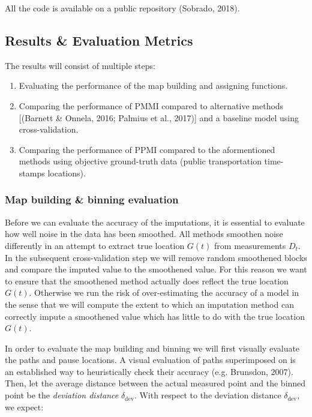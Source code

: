 \documentclass[man]{apa6}
\providecommand{\tightlist}{%
  \setlength{\itemsep}{0pt}\setlength{\parskip}{0pt}}
\theoremstyle{definition}
\theoremstyle{definition}
\theoremstyle{definition}
\theoremstyle{remark}
\begin{document}
All the code is available on a public repository (Sobrado, 2018).

\subsection{Results \& Evaluation
Metrics}\label{results-evaluation-metrics}

The results will consist of multiple steps:

\begin{enumerate}
\def\labelenumi{\arabic{enumi}.}
\tightlist
\item
  Evaluating the performance of the map building and assigning
  functions.
\item
  Comparing the performance of PMMI compared to alternative methods
  {[}(Barnett \& Onnela, 2016; Palmius et al., 2017){]} and a baseline
  model using cross-validation.
\item
  Comparing the performance of PPMI compared to the aformentioned
  methods using objective ground-truth data (public transportation
  time-stamps locations).
\end{enumerate}

\subsubsection{Map building \& binning
evaluation}\label{map-building-binning-evaluation}

Before we can evaluate the accuracy of the imputations, it is essential
to evaluate how well noise in the data has been smoothed. All methods
smoothen noise differently in an attempt to extract true location
\(G(t)\) from measurements \(D_t\). In the subsequent cross-validation
step we will remove random smoothened blocks and compare the imputed
value to the smoothened value. For this reason we want to ensure that
the smoothened method actually does reflect the true location \(G(t)\).
Otherwise we run the risk of over-estimating the accuracy of a model in
the sense that we will compute the extent to which an imputation method
can correctly impute a smoothened value which has little to do with the
true location \(G(t)\).

In order to evaluate the map building and binning we will first visually
evaluate the paths and pause locations. A visual evaluation of paths
superimposed on is an established way to heuristically check their
accuracy (e.g. Brunsdon, 2007). Then, let the average distance between
the actual measured point and the binned point be the \emph{deviation
distance} \(\delta_{\text{dev}}\). With respect to the deviation
distance \(\delta_{\text{dev}}\), we expect:
\end{document}
